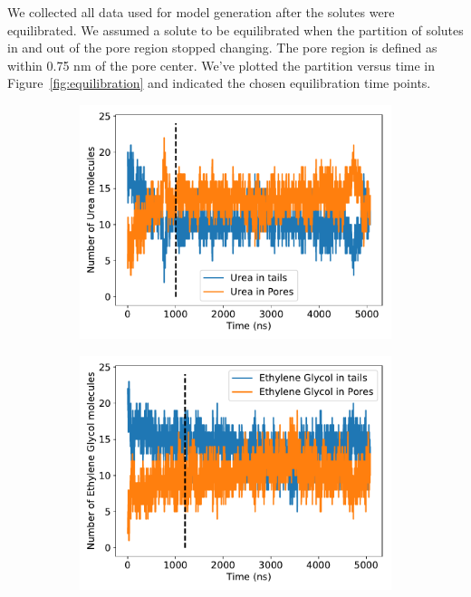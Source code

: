 \documentclass{article}
\begin{document}
  We collected all data used for model generation after the solutes were 
  equilibrated. We assumed a solute to be equilibrated when the partition of
  solutes in and out of the pore region stopped changing. The pore region is
  defined as within 0.75 nm of the pore center. We've plotted the partition
  versus time in Figure~\ref{fig:equilibration} and indicated the chosen
  equilibration time points.
  
  \begin{figure}
  \centering
  \begin{subfigure}{0.45\textwidth}
  \includegraphics[width=\textwidth]{URE_equilibration.pdf}
  \caption{}\label{fig:URE_equilibration}
  \end{subfigure}
  \begin{subfigure}{0.45\textwidth}
  \includegraphics[width=\textwidth]{GCL_equilibration.pdf}

\end{subfigure}
\end{figure}
\end{document}
